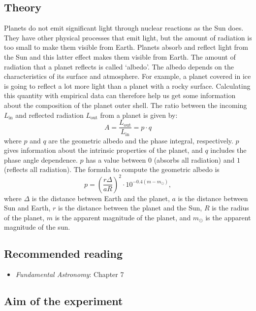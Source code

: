 \documentclass[a4paper, 11pt, fleqn]{memoir}
\begin{document}
\subsection{Theory}
\label{subsection:albedo_theory}

Planets do not emit significant light through nuclear reactions as the Sun does.
They have other physical processes that emit light, but the amount of radiation is too small to make them visible from Earth.
Planets absorb and reflect light from the Sun and this latter effect makes them visible from Earth.
The amount of radiation that a planet reflects is called `albedo'.
The albedo depends on the characteristics of its surface and atmosphere.
For example, a planet covered in ice is going to reflect a lot more light than a planet with a rocky surface.
Calculating this quantity with empirical data can therefore help us get some information about the composition of the planet outer shell.
The ratio between the incoming $L_\text{in}$ and reflected radiation $L_\mathrm{out}$ from a planet is given by:
\begin{equation}
    A = \frac{L_\text{out}}{L_\text{in}} = p \cdot q
\end{equation}
where
$p$ and $q$ are the geometric albedo and the phase integral, respectively.
$p$ gives information about the intrinsic properties of the planet, and
$q$ includes the phase angle dependence.
$p$ has a value between $0$ (absorbs all radiation) and $1$ (reflects all radiation).
The formula to compute the geometric albedo is
\begin{equation}
    p = \left ( \frac{r \Delta}{a R} \right)^2 \cdot 10^{-0.4(m - m_{\odot})},
\end{equation}
where $\Delta$ is the distance between Earth and the planet,
$a$ is the distance between Sun and Earth,
$r$ is the distance between the planet and the Sun,
$R$ is the radius of the planet,
$m$ is the apparent magnitude of the planet,
and $m_{\odot}$ is the apparent magnitude of the sun.

\subsection{Recommended reading}
\begin{itemize}
    \item \emph{Fundamental Astronomy}\autocite{Karttunen2016FundamentalAstronomy}: Chapter 7
\end{itemize}

\subsection{Aim of the experiment}
\end{document}

